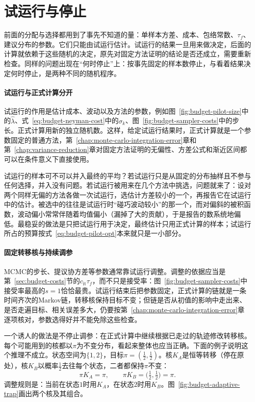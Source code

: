 \section{试运行与停止}
\label{sec:budget-stopping}

前面的分配与选择都用到了事先不知道的量：单样本方差、成本、包络常数、$\tau_{f}$、建议分布的参数。它们只能由试运行估计。试运行的结果一旦用来做决定，后面的计算就依赖于这些随机的决定，原先对固定方法证明的结论是否还成立，需要重新检查。同样的问题出现在“何时停止”上：按事先固定的样本数停止，与看着结果决定何时停止，是两种不同的随机程序。

\paragraph{试运行与正式计算分开}
试运行的作用是估计成本、波动以及方法的参数，例如图~\ref{fig:budget-pilot-size}中的$\hat{\lambda}$、式~\eqref{eq:budget-neyman-cost}中的$\sigma_k$、图~\ref{fig:budget-sampler-costs}中的步长。正式计算用新的独立随机数。这样，给定试运行结果时，正式计算就是一个参数固定的普通方法，第~\ref{chap:monte-carlo-integration-error}章和第~\ref{chap:variance-reduction}章对固定方法证明的无偏性、方差公式和渐近区间都可以在条件意义下直接使用。

试运行的样本可不可以并入最终的平均？若试运行只是从固定的分布抽样且不参与任何选择，并入没有问题。若试运行被用来在几个方法中挑选，问题就来了：设对两个同样无偏的方法各做一次试运行，选估计方差较小的一个，再报告它在试运行中的估计。被选中的往往是试运行时“碰巧波动较小”的那一个，而对偏斜的被积函数，波动偏小常常伴随着均值偏小（漏掉了大的贡献），于是报告的数系统地偏低。最稳妥的做法是只把试运行用于决定，最终估计只用正式计算的样本；试运行所占的预算按式~\eqref{eq:budget-pilot-opt}本来就只是一小部分。

\paragraph{固定转移核与持续调参}
MCMC的步长、提议协方差等参数通常靠试运行调整。调整的依据应当是第~\ref{sec:budget-costs}节的$c_{\mathrm{it}}\tau_{f}$，而不只是接受率：图~\ref{fig:budget-sampler-costs}中接受率最高的$s=1$恰恰最贵。试运行结束后把参数固定，正式计算的链就是一条时间齐次的Markov链，转移核保持目标不变；但链是否从初值的影响中走出来、是否走遍目标、相关误差多大，仍要按第~\ref{chap:monte-carlo-integration-error}章逐项核对，参数选得好并不能免除这些检查。

一个诱人的做法是不停止调参：在正式计算中继续根据已走过的轨迹修改转移核。每个可能用到的核都以$\pi$为不变分布，看起来整体也应当正确。下面的例子说明这个推理不成立。状态空间为$\{1,2\}$，目标$\pi=(\tfrac12,\tfrac12)$。核$K_{A}$是恒等转移（停在原处），核$K_{B}$以概率$\tfrac12$去往每个状态，二者都保持$\pi$不变：
\[
  \pi K_{A}=\pi,\qquad\pi K_{B}=\bigl(\tfrac12,\tfrac12\bigr)=\pi .
\]
调整规则是：当前在状态$1$时用$K_{A}$，在状态$2$时用$K_{B}$。图~\ref{fig:budget-adaptive-trap}画出两个核及其组合。

